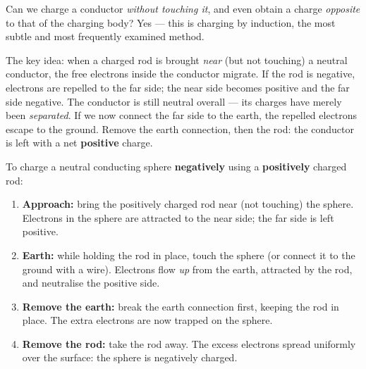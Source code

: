 \documentclass[11pt]{article}
\newcommand{\cle}[1]{{\popxbold\color{popdark}#1}}
\newcounter{popsec}
\newcounter{popsub}
\newcommand{\courssub}[1]{%
  \stepcounter{popsub}%
  \par\vspace{9pt}\noindent{\popxbold\fontsize{11.5}{13}\selectfont\color{popink}{\color{poporange}\thepopsec.\thepopsub}\hspace{6pt}#1}\par\nopagebreak\vspace{4pt}
}
\begin{document}
\courssub{Charging by Induction}

Can we charge a conductor \emph{without touching it}, and even obtain a charge \emph{opposite} to that of the charging body? Yes --- this is \cle{charging by induction}, the most subtle and most frequently examined method.

The key idea: when a charged rod is brought \emph{near} (but not touching) a neutral conductor, the free electrons inside the conductor migrate. If the rod is negative, electrons are repelled to the far side; the near side becomes positive and the far side negative. The conductor is still neutral overall --- its charges have merely been \emph{separated}. If we now connect the far side to the earth, the repelled electrons escape to the ground. Remove the earth connection, then the rod: the conductor is left with a net \textbf{positive} charge.

\begin{methode}
To charge a neutral conducting sphere \textbf{negatively} using a \textbf{positively} charged rod:
\begin{enumerate}
\item \textbf{Approach:} bring the positively charged rod near (not touching) the sphere. Electrons in the sphere are attracted to the near side; the far side is left positive.
\item \textbf{Earth:} while holding the rod in place, touch the sphere (or connect it to the ground with a wire). Electrons flow \emph{up} from the earth, attracted by the rod, and neutralise the positive side.
\item \textbf{Remove the earth:} break the earth connection first, keeping the rod in place. The extra electrons are now trapped on the sphere.
\item \textbf{Remove the rod:} take the rod away. The excess electrons spread uniformly over the surface: the sphere is negatively charged.
\end{enumerate}
\end{methode}
\end{document}
